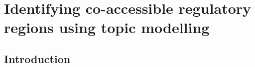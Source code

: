 

\chapter{Identifying co-accessible regulatory regions using topic modelling} \label{ch4}

\minitoc

\providecommand{\tightlist}{%
  \setlength{\itemsep}{0pt}\setlength{\parskip}{0pt}}


\section{Introduction} \label{ch4:intro}

